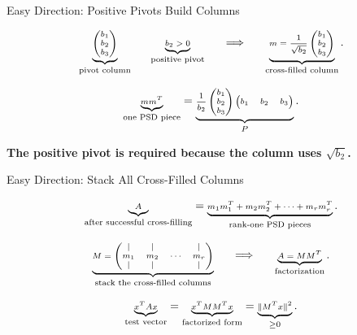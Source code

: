 \documentclass[10pt]{beamer}
\theoremstyle{definition}
\newcommand{\x}[1]{\alert{\textbf{#1}}}
\begin{document}
\begin{frame}[shrink=8]{Easy Direction: Positive Pivots Build Columns}

\[
\scriptsize
\underbrace{
\begin{pmatrix}
b_1\\ b_2\\ b_3
\end{pmatrix}}_{\text{pivot column}}
\qquad
\underbrace{b_2>0}_{\text{positive pivot}}
\qquad
\Longrightarrow
\qquad
\underbrace{m=\frac1{\sqrt{b_2}}
\begin{pmatrix}
b_1\\ b_2\\ b_3
\end{pmatrix}}_{\text{cross-filled column}}.
\]

\vfill

\[
\scriptsize
\underbrace{mm^T}_{\text{one PSD piece}}
=
\underbrace{\frac1{b_2}
\begin{pmatrix}b_1\\ b_2\\ b_3\end{pmatrix}
\begin{pmatrix}b_1&b_2&b_3\end{pmatrix}}_{P}.
\]

\vfill

\begin{center}
\x{The positive pivot is required because the column uses $\sqrt{b_2}$.}
\end{center}

\end{frame}


\begin{frame}[shrink=8]{Easy Direction: Stack All Cross-Filled Columns}

\[
\scriptsize
\underbrace{A}_{\text{after successful cross-filling}}
=
\underbrace{m_1m_1^T+m_2m_2^T+\cdots+m_rm_r^T}_{\text{rank-one PSD pieces}}.
\]

\vfill

\[
\scriptsize
\underbrace{
M=
\begin{pmatrix}
|&|&&|\\
m_1&m_2&\cdots&m_r\\
|&|&&|
\end{pmatrix}}_{\text{stack the cross-filled columns}}
\qquad\Longrightarrow\qquad
\underbrace{A=MM^T}_{\text{factorization}}.
\]

\vfill

\[
\scriptsize
\underbrace{x^TAx}_{\text{test vector}}
=
\underbrace{x^TMM^Tx}_{\text{factorized form}}
=
\underbrace{\|M^Tx\|^2}_{\ge0}.
\]

\end{frame}
\end{document}
